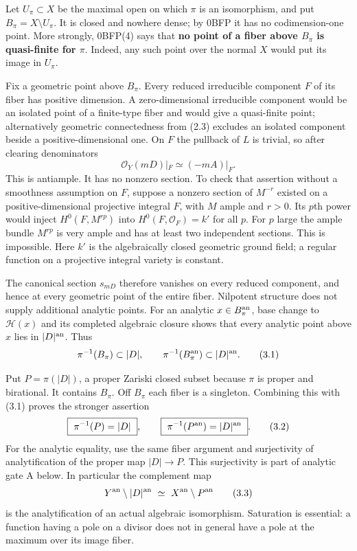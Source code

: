 \documentclass[
  10pt,
]{article}
\begin{document}
Let \(U_\pi\subset X\) be the maximal open on which \(\pi\) is an
isomorphism, and put \(B_\pi=X\setminus U_\pi\). It is closed and
nowhere dense; by 0BFP it has no codimension-one point. More strongly,
0BFP(4) says that \textbf{no point of a fiber above \(B_\pi\) is
quasi-finite for \(\pi\)}. Indeed, any such point over the normal \(X\)
would put its image in \(U_\pi\).

Fix a geometric point above \(B_\pi\). Every reduced irreducible
component \(F\) of its fiber has positive dimension. A zero-dimensional
irreducible component would be an isolated point of a finite-type fiber
and would give a quasi-finite point; alternatively geometric
connectedness from (2.3) excludes an isolated component beside a
positive-dimensional one. On \(F\) the pullback of \(L\) is trivial, so
after clearing denominators \[
 \mathcal O_Y(mD)|_F\simeq(-mA)|_F.
\] This is antiample. It has no nonzero section. To check that assertion
without a smoothness assumption on \(F\), suppose a nonzero section of
\(M^{-r}\) existed on a positive-dimensional projective integral \(F\),
with \(M\) ample and \(r>0\). Its \(p\)th power would inject
\(H^0(F,M^{rp})\) into \(H^0(F,\mathcal O_F)=k'\) for all \(p\). For
\(p\) large the ample bundle \(M^{rp}\) is very ample and has at least
two independent sections. This is impossible. Here \(k'\) is the
algebraically closed geometric ground field; a regular function on a
projective integral variety is constant.

The canonical section \(s_{mD}\) therefore vanishes on every reduced
component, and hence at every geometric point of the entire fiber.
Nilpotent structure does not supply additional analytic points. For an
analytic \(x\in B_\pi^{\rm an}\), base change to \(\mathcal H(x)\) and
its completed algebraic closure shows that every analytic point above
\(x\) lies in \(|D|^{\rm an}\). Thus \[
 \pi^{-1}(B_\pi)\subset |D|,\qquad
 \pi^{-1}(B_\pi^{\rm an})\subset |D|^{\rm an}.
 \tag{3.1}
\]

Put \(P=\pi(|D|)\), a proper Zariski closed subset because \(\pi\) is
proper and birational. It contains \(B_\pi\). Off \(B_\pi\) each fiber
is a singleton. Combining this with (3.1) proves the stronger assertion
\[
 \boxed{\ \pi^{-1}(P)=|D|\ },\qquad
 \boxed{\ \pi^{-1}(P^{\rm an})=|D|^{\rm an}\ }.
 \tag{3.2}
\] For the analytic equality, use the same fiber argument and
surjectivity of analytification of the proper map \(|D|\to P\). This
surjectivity is part of analytic gate A below. In particular the
complement map \[
 Y^{\rm an}\setminus|D|^{\rm an}\ \simeq\ X^{\rm an}\setminus P^{\rm an}
 \tag{3.3}
\] is the analytification of an actual algebraic isomorphism. Saturation
is essential: a function having a pole on a divisor does not in general
have a pole at the maximum over its image fiber.
\end{document}
